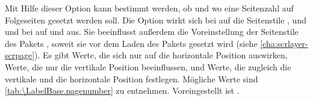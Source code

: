 \begin{Declaration}
\end{Declaration}
Mit Hilfe dieser Option kann bestimmt werden, ob und wo eine Seitenzahl auf
Folgeseiten gesetzt werden soll.  Die Option wirkt sich bei
 auf die
Seitenstile
,
 und
 und bei
 auf
 und
 aus. Sie beeinflusst außerdem die
Voreinstellung der Seitenstile des Pakets
\hyperref[cha:scrlayer-scrpage]{}%
%
, soweit sie vor dem Laden des Pakets gesetzt
wird (siehe \autoref{cha:scrlayer-scrpage}). Es gibt Werte, die sich nur auf
die horizontale Position auswirken, Werte, die nur die vertikale Position
beeinflussen, und Werte, die zugleich die vertikale und die horizontale
Position festlegen. Mögliche Werte sind \autoref{tab:\LabelBase.pagenumber} zu
entnehmen. Voreingestellt ist .%
%
